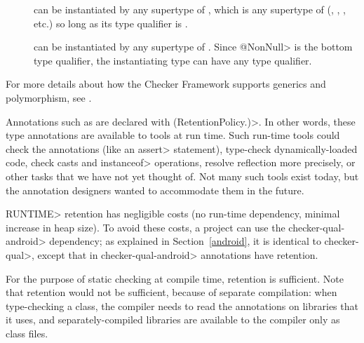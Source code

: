 \begin{description}
\item[]
   can be instantiated by any supertype of ,
  which is any supertype of  (,
  , , etc.) so long as its type
  qualifier is .

\item[]
   can be instantiated by any supertype of .
  Since \<@NonNull> is the bottom type qualifier, the instantiating type
  can have any type qualifier.

\end{description}

For more details about how the Checker Framework supports generics and
polymorphism, see .



Annotations such as  are
declared with
\<(RetentionPolicy.)>.  In other words,
these type annotations are available to tools at run time.  Such run-time
tools could check the annotations (like an \<assert> statement), type-check
dynamically-loaded code, check casts and \<instanceof> operations, resolve
reflection more precisely, or other tasks that we have not yet thought of.
Not many such tools exist today, but the annotation designers wanted to
accommodate them in the future.

\<RUNTIME> retention has negligible costs (no run-time dependency, minimal
increase in heap size). To avoid these costs, a project can use the
\<checker-qual-android> dependency; as explained in Section~\ref{android},
it is identical to \<checker-qual>, except that in \<checker-qual-android>
annotations have
retention.

For the purpose of static checking at compile time,
retention is sufficient.  Note that
retention would not be sufficient, because of separate compilation: when
type-checking a class, the compiler needs to read the annotations on
libraries that it uses, and separately-compiled libraries are available to
the compiler only as class files.


